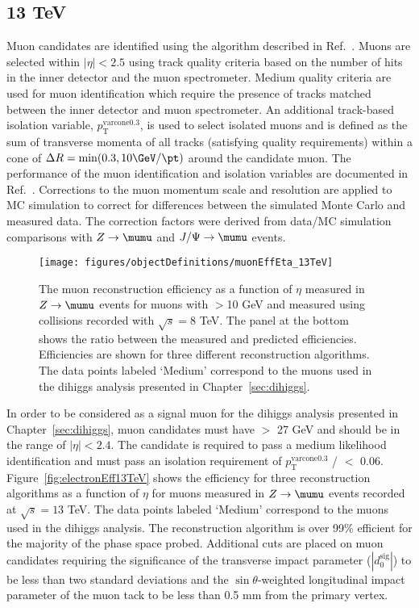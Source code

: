 \subsection{13 TeV}
\label{sec:muon13TeV}
Muon candidates are identified using the algorithm described in Ref.~\cite{Aad:2016jkr}. Muons are selected within $|\eta| < 2.5$ using track quality criteria based on the number of hits in the inner detector and the muon spectrometer. Medium quality criteria are used for muon identification which require the presence of tracks matched between the inner detector and muon spectrometer. An additional track-based isolation variable, $p_{\text{T}}^{\text{varcone0.3}}$, is used to select isolated muons and is defined as the sum of transverse momenta of all tracks (satisfying quality requirements) within a cone of $\Delta R = \mathrm{min}(0.3,10 \GeV/\pt)$ around the candidate muon. The performance of the muon identification and isolation variables are documented in Ref.~\cite{Aad:2016jkr}. Corrections to the muon momentum scale and resolution are applied to MC simulation to correct for differences between the simulated Monte Carlo and measured data. The correction factors were derived from data/MC simulation comparisons with $Z\to \mumu$ and $J/\Psi \to \mumu$ events.%

\begin{figure}[h!]
  \centering
  \label{fig:muonEff13TeV}
  \texttt{[image: figures/objectDefinitions/muonEffEta\_13TeV]}
  \caption{The muon reconstruction efficiency as a function of $\eta$ measured in $Z\rightarrow\mumu$ events for muons with \pt$>$10 GeV and measured using collisions recorded with $\sqrt{s}=8$ TeV. The panel at the bottom shows the ratio between the measured and predicted efficiencies. Efficiencies are shown for three different reconstruction algorithms. The data points labeled `Medium' correspond to the muons used in the dihiggs analysis presented in Chapter~\ref{sec:dihiggs}.}
\end{figure}

In order to be considered as a signal muon for the dihiggs analysis presented in Chapter~\ref{sec:dihiggs}, muon candidates must have \pt$>$ 27 GeV and should be in the range of $|\eta|< 2.4$. The candidate is required to pass a medium likelihood identification and must pass an isolation requirement of $p_{\text{T}}^{\text{varcone0.3}}$ / \pt $<$ 0.06. Figure~\ref{fig:electronEff13TeV} shows the efficiency for three reconstruction algorithms as a function of $\eta$ for muons measured in $Z\rightarrow\mumu$ events recorded at $\sqrt{s}=13$ TeV. The data points labeled `Medium' correspond to the muons used in the dihiggs analysis. The reconstruction algorithm is over 99\% efficient for the majority of the phase space probed. Additional cuts are placed on muon candidates requiring the significance of the transverse impact parameter ($|d_{0}^{\textrm{sig}}|$) to be less than two standard deviations and the $\sin\theta$-weighted longitudinal impact parameter of the muon tack to be less than 0.5 mm from the primary vertex. 

